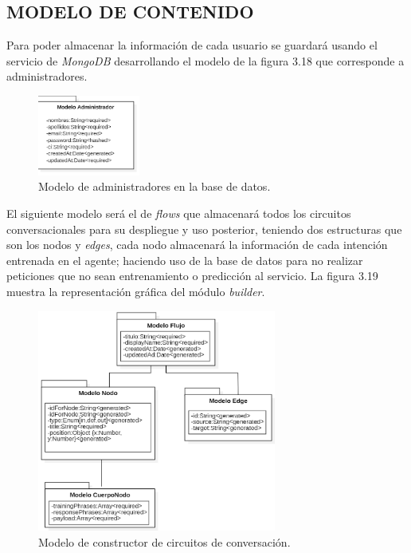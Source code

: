 \documentclass[letter, openright, 12pt]{book}
\begin{document}
\subsection{MODELO DE CONTENIDO}
Para poder almacenar la información de cada usuario se guardará usando el servicio de {\it MongoDB} desarrollando el modelo de la figura 3.18 que corresponde a administradores. 

\begin{figure}[H]
\centering
\includegraphics[width=0.3\textwidth]{figura3_18}
 \caption{Modelo de administradores en la base de datos. }
\label{fig:figura3_18}
\end{figure}

El siguiente modelo será el de {\it flows } que almacenará todos los circuitos conversacionales para su despliegue y uso posterior, teniendo dos estructuras que son los nodos y {\it edges}, cada nodo almacenará la información de cada intención entrenada en el agente; haciendo uso de la base de datos para no realizar peticiones que no sean entrenamiento o predicción al servicio. La figura 3.19 muestra la representación gráfica del módulo {\it builder}. 

\begin{figure}[H]
\centering
\includegraphics[width=0.7\textwidth]{figura3_19}
 \caption{Modelo de constructor de circuitos de conversación. }
\label{fig:figura3_19}
\end{figure}
\end{document}
